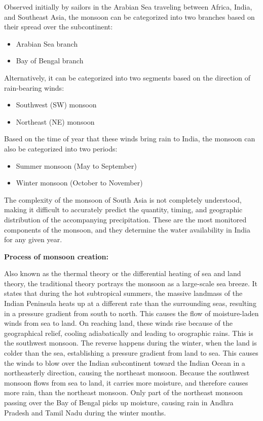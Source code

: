 \documentclass[12pt,openany]{book}
\providecommand{\tightlist}{%
  \setlength{\itemsep}{0pt}\setlength{\parskip}{0pt}}
\begin{document}
Observed initially by sailors in the Arabian Sea traveling between Africa, India, and Southeast Asia, the monsoon can be categorized into two branches based on their spread over the subcontinent:

\begin{itemize}
\tightlist
\item
  Arabian Sea branch
\item
  Bay of Bengal branch
\end{itemize}

Alternatively, it can be categorized into two segments based on the direction of rain-bearing winds:

\begin{itemize}
\tightlist
\item
  Southwest (SW) monsoon
\item
  Northeast (NE) monsoon
\end{itemize}

Based on the time of year that these winds bring rain to India, the monsoon can also be categorized into two periods:

\begin{itemize}
\tightlist
\item
  Summer monsoon (May to September)
\item
  Winter monsoon (October to November)
\end{itemize}

The complexity of the monsoon of South Asia is not completely understood, making it difficult to accurately predict the quantity, timing, and geographic distribution of the accompanying precipitation. These are the most monitored components of the monsoon, and they determine the water availability in India for any given year.

\textbf{Process of monsoon creation:}

Also known as the thermal theory or the differential heating of sea and land theory, the traditional theory portrays the monsoon as a large-scale sea breeze. It states that during the hot subtropical summers, the massive landmass of the Indian Peninsula heats up at a different rate than the surrounding seas, resulting in a pressure gradient from south to north. This causes the flow of moisture-laden winds from sea to land. On reaching land, these winds rise because of the geographical relief, cooling adiabatically and leading to orographic rains. This is the southwest monsoon. The reverse happens during the winter, when the land is colder than the sea, establishing a pressure gradient from land to sea. This causes the winds to blow over the Indian subcontinent toward the Indian Ocean in a northeasterly direction, causing the northeast monsoon. Because the southwest monsoon flows from sea to land, it carries more moisture, and therefore causes more rain, than the northeast monsoon. Only part of the northeast monsoon passing over the Bay of Bengal picks up moisture, causing rain in Andhra Pradesh and Tamil Nadu during the winter months.
\end{document}
